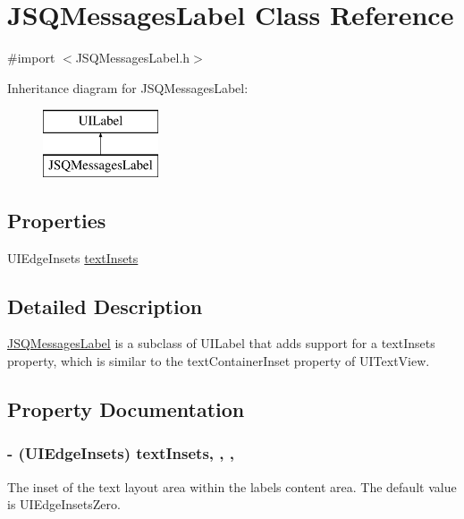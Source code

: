 \hypertarget{interface_j_s_q_messages_label}{}\section{J\+S\+Q\+Messages\+Label Class Reference}
\label{interface_j_s_q_messages_label}


{\ttfamily \#import $<$J\+S\+Q\+Messages\+Label.\+h$>$}

Inheritance diagram for J\+S\+Q\+Messages\+Label\+:\begin{figure}[H]
\begin{center}
\leavevmode
\includegraphics[height=2.000000cm]{interface_j_s_q_messages_label}
\end{center}
\end{figure}
\subsection*{Properties}
\begin{DoxyCompactItemize}
\item 
U\+I\+Edge\+Insets \hyperlink{interface_j_s_q_messages_label_a0b7fcd1a8f9560acee263ce4c3872feb}{text\+Insets}
\end{DoxyCompactItemize}


\subsection{Detailed Description}
{\ttfamily \hyperlink{interface_j_s_q_messages_label}{J\+S\+Q\+Messages\+Label}} is a subclass of {\ttfamily U\+I\+Label} that adds support for a {\ttfamily text\+Insets} property, which is similar to the {\ttfamily text\+Container\+Inset} property of {\ttfamily U\+I\+Text\+View}. 

\subsection{Property Documentation}
\hypertarget{interface_j_s_q_messages_label_a0b7fcd1a8f9560acee263ce4c3872feb}{}
\subsubsection[{text\+Insets}]{\setlength{\rightskip}{0pt plus 5cm}-\/ (U\+I\+Edge\+Insets) text\+Insets\hspace{0.3cm}{\ttfamily [read]}, {\ttfamily [write]}, {\ttfamily [nonatomic]}, {\ttfamily [assign]}}\label{interface_j_s_q_messages_label_a0b7fcd1a8f9560acee263ce4c3872feb}
The inset of the text layout area within the label\textquotesingle{}s content area. The default value is {\ttfamily U\+I\+Edge\+Insets\+Zero}.

